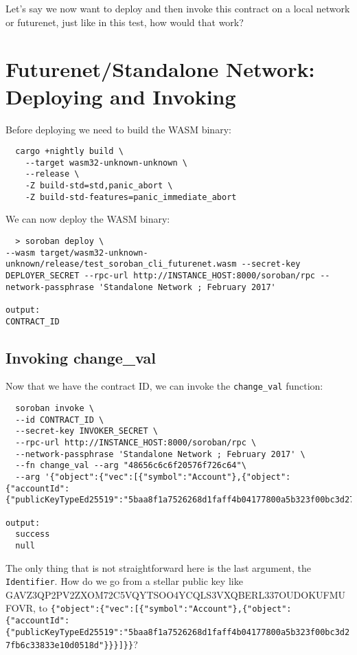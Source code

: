 Let's say we now want to deploy and then invoke this contract on a local network or futurenet, just like in this test, how would that work?

\section{Futurenet/Standalone Network: Deploying and Invoking}\label{futurenetstandalone-network-deploying-and-invoking}

Before deploying we need to build the WASM binary:

\begin{lstlisting}
  cargo +nightly build \
    --target wasm32-unknown-unknown \
    --release \
    -Z build-std=std,panic_abort \
    -Z build-std-features=panic_immediate_abort
\end{lstlisting}
   

We can now deploy the WASM binary:

\begin{lstlisting}
  > soroban deploy \
--wasm target/wasm32-unknown-unknown/release/test_soroban_cli_futurenet.wasm --secret-key DEPLOYER_SECRET --rpc-url http://INSTANCE_HOST:8000/soroban/rpc --network-passphrase 'Standalone Network ; February 2017'

output:
CONTRACT_ID
\end{lstlisting}

\subsection{Invoking change\_val}\label{invoking-changeux5fval}

Now that we have the contract ID, we can invoke the \texttt{change\_val} function:

\begin{lstlisting}
  soroban invoke \
  --id CONTRACT_ID \
  --secret-key INVOKER_SECRET \
  --rpc-url http://INSTANCE_HOST:8000/soroban/rpc \
  --network-passphrase 'Standalone Network ; February 2017' \
  --fn change_val --arg "48656c6c6f20576f726c64"\
  --arg '{"object":{"vec":[{"symbol":"Account"},{"object":{"accountId":{"publicKeyTypeEd25519":"5baa8f1a7526268d1faff4b04177800a5b323f00bc3d27fb6c33833e10d0518d"}}}]}}'

output:
  success
  null
\end{lstlisting}

The only thing that is not straightforward here is the last argument, the \texttt{Identifier}. How do we go from a stellar public key like GAVZ3QP2PV2ZXOM72C5VQYTSOO4YCQLS3VXQBERL337OUDOKUFMUFOVR, to \texttt{\{"object":\{"vec":{[}\{"symbol":"Account"\},\{"object":\{"accountId":\{"publicKeyTypeEd25519":"5baa8f1a7526268d1faff4b04177800a5b323f00bc3d27fb6c33833e10d0518d"\}\}\}{]}\}\}}?

